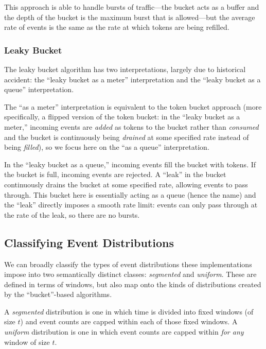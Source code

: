 \documentclass[acmsmall,nonacm,screen]{acmart}
\begin{document}
This approach is able to handle bursts of traffic—the bucket acts as a buffer and the depth of the bucket is the maximum burst that is allowed—but the average rate of events is the same as the rate at which tokens are being refilled.

\subsubsection{Leaky Bucket}
The leaky bucket algorithm has two interpretations, largely due to historical accident: the ``leaky bucket as a meter'' interpretation and the ``leaky bucket as a queue'' interpretation.

The ``as a meter'' interpretation is equivalent to the token bucket approach (more specifically, a flipped version of the token bucket: in the ``leaky bucket as a meter,'' incoming events are \textit{added} as tokens to the bucket rather than \textit{consumed} and the bucket is continuously being \textit{drained} at some specified rate instead of being \textit{filled}), so we focus here on the ``as a queue'' interpretation.

In the ``leaky bucket as a queue,'' incoming events fill the bucket with tokens. If the bucket is full, incoming events are rejected. A ``leak'' in the bucket continuously drains the bucket at some specified rate, allowing events to pass through. This bucket here is essentially acting as a queue (hence the name) and the ``leak'' directly imposes a smooth rate limit: events can only pass through at the rate of the leak, so there are no bursts.

\subsection{Classifying Event Distributions}
We can broadly classify the types of event distributions these implementations impose into two semantically distinct classes: \textit{segmented} and \textit{uniform}. These are defined in terms of windows, but also map onto the kinds of distributions created by the ``bucket''-based algorithms.

A \textit{segmented} distribution is one in which time is divided into fixed windows (of size $t$) and event counts are capped within each of those fixed windows. A \textit{uniform} distribution is one in which event counts are capped within \textit{for any} window of size $t$.
\end{document}
